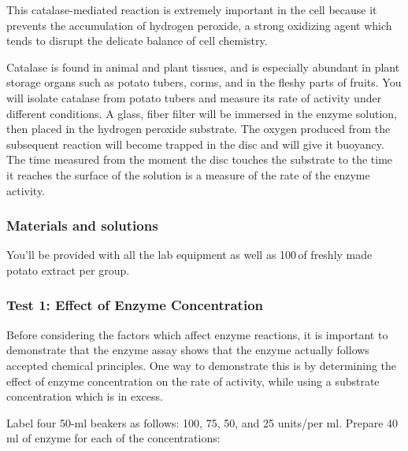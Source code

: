 
This catalase-mediated reaction is extremely important in the cell because it prevents the accumulation of hydrogen peroxide, a strong oxidizing agent which tends to disrupt the delicate balance of cell chemistry.

Catalase is found in animal and plant tissues, and is especially abundant in plant storage organs such as potato tubers, corms, and in the fleshy parts of fruits. You will isolate catalase from potato tubers and measure its rate of activity under different conditions. A glass, fiber filter will be immersed in the enzyme solution, then placed in the hydrogen peroxide substrate. The oxygen produced from the subsequent reaction will become trapped in the disc and will give it buoyancy. The time measured from the moment the disc touches the substrate to the time it reaches the surface of the solution is a measure of the rate of the enzyme activity.


\subsubsection*{Materials and solutions}
You'll be provided with all the lab equipment as well as 100\,\milli\litre of freshly made potato extract per group.

\subsubsection{Test 1: Effect of Enzyme Concentration}
Before considering the factors which affect enzyme reactions, it is important to demonstrate that the enzyme assay shows that the enzyme actually follows accepted chemical principles. One way to demonstrate this is by determining the effect of enzyme concentration on the rate of activity, while using a substrate concentration which is in excess.

Label four 50-ml beakers as follows: 100, 75, 50, and 25 units/per ml. Prepare 40 ml of enzyme for each of the concentrations:

